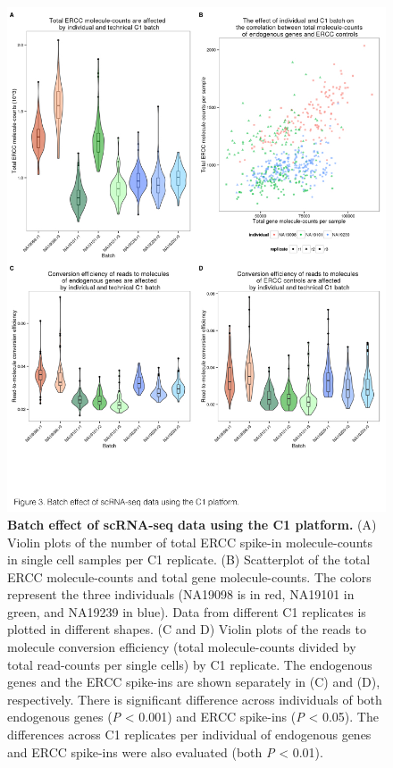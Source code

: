 \begin{figure}
\centering \includegraphics[trim=0 .5in 0
  0,clip,width=5in]{img/ch04/Figure03.jpeg}
\caption[Batch effect of scRNA-seq data using the C1
  platform.]{\textbf{Batch effect of scRNA-seq data using the C1
    platform.} (A) Violin plots of the number of total ERCC spike-in
  molecule-counts in single cell samples per C1 replicate. (B)
  Scatterplot of the total ERCC molecule-counts and total gene
  molecule-counts. The colors represent the three individuals (NA19098
  is in red, NA19101 in green, and NA19239 in blue). Data from
  different C1 replicates is plotted in different shapes. (C and D)
  Violin plots of the reads to molecule conversion efficiency (total
  molecule-counts divided by total read-counts per single cells) by C1
  replicate. The endogenous genes and the ERCC spike-ins are shown
  separately in (C) and (D), respectively.  There is significant
  difference across individuals of both endogenous genes (\emph{P}
  \textless{} 0.001) and ERCC spike-ins (\emph{P} \textless{}
  0.05). The differences across C1 replicates per individual of
  endogenous genes and ERCC spike-ins were also evaluated (both
  \emph{P} \textless{} 0.01).}
\label{fig:batch}
\end{figure}

